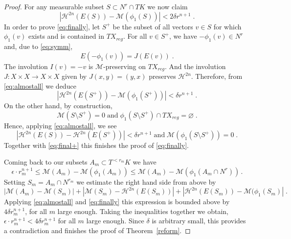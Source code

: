 \documentclass[12pt,leqno]{amsart}
\numberwithin{equation}{section}
\theoremstyle{definition}
\theoremstyle{remark}
\newcommand{\tref}[1]{Theorem~\ref{#1}}
\def\:{\colon}
\def\emptyset{\varnothing}
\begin{document}
\begin{proof}
For any measurable subset $S\subset N^r \cap TK$  we now claim
\begin{equation} \label{eq:finally}
|\mathcal H^{2n} (E(S)) - \mathcal M (\phi _1 (S))|  <  2 \delta r^{n+1} \; .
\end{equation}
In order to prove \eqref{eq:finally}, let $S^+$ be the subset of all vectors $v\in S $ for which $\phi_1 (v)$ exists  and is contained in $TX_{reg}$.
For all $v\in S^+$, we have $-\phi _1 (v) \in N^r$ and,   due to \eqref{eq:symm},
$$E(-\phi_1 (v)) =J(E(v)) \;.$$
The involution  $I(v)=-v$ is $\mathcal M$-preserving on $TX_{reg}$.  And the involution
 $J\:X\times X\to X\times X$ given by $J(x,y)=(y,x)$ preserves $\mathcal H^{2n}$. Therefore, from \eqref{eq:almostall} we deduce
 \begin{equation} \label{eq:final+}
 |\mathcal H^{2n} (E(S^+)) - \mathcal M (\phi _1 (S^+))|  <   \delta r^{n+1} \;.
\end{equation}
On the other hand, by construction,
 $$ \mathcal M (S\setminus S^+ )=0 \; \text{and} \; \phi _1 (S\setminus S^+)\cap TX_{reg} =\emptyset \; .$$
  Hence, applying \eqref{eq:almostall}, we see
 $$|\mathcal H^{2n} (E(S))- \mathcal H^{2n} (E(S^+))|< \delta r^{n+1} \; \text{and} \; \mathcal M (\phi _1 (S\setminus S^+)) =0 \;.$$
 Together with \eqref{eq:final+}  this finishes the proof of \eqref{eq:finally}.


Coming back to our subsets $A_m\subset T^{<r_m} K$ we have
 $$\epsilon \cdot r_m^ {n+1} \leq \mathcal M ( A_m) - \mathcal M( \phi _1 (A_m)) \leq \mathcal M ( A_m) - \mathcal M( \phi _1 (A_m\cap N^r)) \,.$$
Setting  $S_m=A_m\cap N^{r_m}$ we estimate the right hand side from above by
$$|\mathcal M (A_m) -  \mathcal M(S_m)|
+|\mathcal M (S_m )  - \mathcal H^{2n} (E(S_m) )| + | \mathcal H ^{2n} (E(S_m)) - \mathcal M (\phi _1(S_m)|  \;.$$
Applying  \eqref{eq:almostall} and \eqref{eq:finally}  this expression is bounded above by $4 \delta r _m^{n+1}$, for all $m$ large enough. Taking the inequalities together we obtain,  $\epsilon \cdot r_m^ {n+1}< 4 \delta r _m^{n+1}$ for all $m$ large enough.
Since $\delta$ is arbitrary small, this provides a  contradiction  and  finishes the proof of \tref{reform}.
\end{proof}
\end{document}
